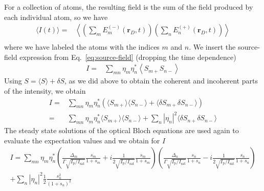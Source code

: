 \documentclass[11pt,letter]{article}
\newcommand{\bv}[1]{\ensuremath{\bm{#1}}}
\begin{document}
For a collection of atoms, the resulting field is the sum of the field produced
by each individual atom, so we have  
\begin{equation}
\begin{split}
\langle I (t) \rangle = & 
    \left\langle \left( \sum_{m} E_{m}^{(-)}(\bv{r}_{D}, t) \right)
            \left( \sum_{n} E_{n}^{(+)}(\bv{r}_{D}, t) \right) \right\rangle \\
\end{split} 
\end{equation}
where we have labeled the atoms with the indices $m$ and $n$.  We insert the
source-field expression from Eq.~\ref{eq:source-field} (dropping the time
dependence) 
\begin{equation}
\begin{split}
 I = &
    \sum_{mn}  \eta_{m}\eta_{n}^{*}  
              \left\langle S_{m+}S_{n-} \right\rangle
\end{split} 
\end{equation}
Using $S=\langle S \rangle + \delta S$, as we did above to obtain the coherent
and incoherent parts of the intensity, we obtain
\begin{equation}
\begin{split}
 I  = &
    \sum_{mn}  \eta_{m}\eta_{n}^{*} \left(
              \langle S_{m+}\rangle \langle S_{n-} \rangle  
            + \langle \delta S_{m+} \delta S_{n-} \rangle \right) \\
    = & 
    \sum_{mn}  \eta_{m}\eta_{n}^{*} 
        \langle  S_{m+}\rangle \langle S_{n-} \rangle 
   + \sum_{n} | \eta_{n}|^{2} \langle \delta S_{n+} \delta S_{n-} \rangle 
\end{split} 
\end{equation}
The steady state solutions of the optical Bloch equations are used again to
evaluate the expectation values and we obtain for $I$
\begin{multline}
 I = 
  \sum_{mn}  \eta_{m}\eta_{n}^{*}
    \left(
    \frac{ \Delta_{m} }{ \Gamma  \sqrt{ I_{\mathrm{p}} / I_{\mathrm{sat}}} } 
    \frac{s_{m}}{ 1 + s_{m} } 
   + i 
    \frac{ 1 } { 2 \sqrt{ I_{\mathrm{p}} / I_{\mathrm{sat}}} } \frac{s_{m}}{1+s_{m}} 
    \right) 
    \left(
    \frac{ \Delta_{n} }{ \Gamma  \sqrt{ I_{\mathrm{p}} / I_{\mathrm{sat}}} } 
    \frac{s_{n}}{ 1 + s_{n} } 
   - i 
    \frac{ 1 } { 2 \sqrt{ I_{\mathrm{p}} / I_{\mathrm{sat}}} } \frac{s_{n}}{1+s_{n}} 
    \right) \\
   + \sum_{n} | \eta_{n}|^{2} \frac{1}{2} \frac{ s_{n}^{2} } { (1 + s _{n} )^{2} } 
\end{multline}
\end{document}
